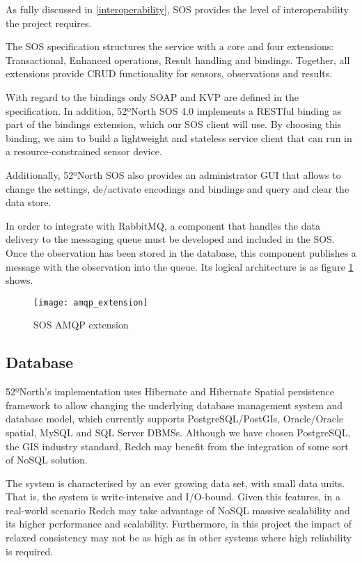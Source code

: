 As fully discussed in \ref{interoperability}, SOS provides the level of interoperability the project requires.

The SOS specification structures the service with a core and four extensions: Transactional, Enhanced operations, Result handling and bindings. Together, all extensions provide CRUD functionality for sensors, observations and results.

With regard to the bindings only SOAP and KVP are defined in the specification. In addition, 52ºNorth SOS 4.0 implements a RESTful binding as part of the bindings extension, which our SOS client will use. By choosing this binding, we aim to build a lightweight and stateless service client that can run in a resource-constrained sensor device.

Additionally, 52ºNorth SOS also provides an administrator GUI that allows to change the settings, de/activate encodings and bindings and query and clear the data store.

In order to integrate with RabbitMQ, a component that handles the data delivery to the messaging queue must be developed and included in the SOS. Once the observation has been stored in the database, this component publishes a message with the observation into the queue. Its logical architecture is as figure \ref{fig:amqp_extension} shows.

\begin{figure}[p]
	\centering
	\texttt{[image: amqp\_extension]}
	\caption{SOS AMQP extension}
	\label{fig:amqp_extension}
\end{figure}

\subsection{Database}

52ºNorth's implementation uses Hibernate and Hibernate Spatial persistence framework to allow changing the underlying database management system and database model, which currently supports PostgreSQL/PostGIs, Oracle/Oracle spatial, MySQL and SQL Server DBMSs. Although we have chosen PostgreSQL, the GIS industry standard, Redch may benefit from the integration of some sort of NoSQL solution.

The system is characterised by an ever growing data set, with small data units. That is, the system is write-intensive and I/O-bound. Given this features, in a real-world scenario Redch may take advantage of NoSQL massive scalability and its higher performance and scalability. Furthermore, in this project the impact of relaxed consistency may not be as high as in other systems where high reliability is required.

